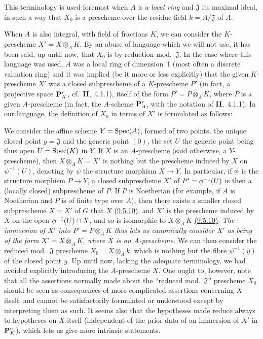 \begin{env}
\label{env-1.3.7.2}
This terminology is used foremost when $A$ is a \emph{local ring} and $\mathfrak{J}$ its maximal ideal, in such a way that $X_0$ is a prescheme over the residue field $k=A/\mathfrak{J}$ of $A$.

When $A$ is also integral, with field of fractions $K$, we can consider the $K$-prescheme $X'=X\otimes_A K$.
By an abuse of language which we will not use, it has been said, up until now, that $X_0$ is  by reduction mod.~$\mathfrak{J}$.
In the case where this language was used, $A$ was a local ring of dimension~1 (most often a discrete valuation ring) and it was implied (be it more or less explicitly) that the given $K$-prescheme $X'$ was a closed subprescheme of a $K$-prescheme $P'$ (in fact, a projective space  $\mathbf{P}_K^r$, cf.~\textbf{II},~4.1.1), itself of the form $P'=P\otimes_A K$, where $P$ is a given $A$-prescheme (in fact, the $A$-scheme $\mathbf{P}_A^r$, with the notation of \textbf{II},~4.1.1).
In our language, the definition of $X_0$ in terms of $X'$ is formulated as follows:

We consider the affine scheme $Y={\mathop{\mathrm{Spec}}\nolimits}(A)$, formed of two points, the unique closed point $y=\mathfrak{J}$ and the generic point $(0)$, the set $U$  the generic point being thus open $U={\mathop{\mathrm{Spec}}\nolimits}(K)$ in $Y$.
If $X$ is an $A$-prescheme (said otherwise, a $Y$-prescheme), then $X\otimes_A K=X'$ is nothing but the prescheme induced by $X$ on $\psi^{-1}(U)$, denoting by $\psi$ the structure morphism $X\to Y$.
In particular, if $\phi$ is the structure morphism $P\to Y$, a closed subprescheme $X'$ of $P'=\phi^{-1}(U)$ is then a (locally closed) subprescheme of $P$.
If $P$ is Noetherian (for example, if $A$ is Noetherian and $P$ is of finite type over $A$), then there exists a smaller closed subprescheme $X=\overline{X'}$ of $G$ that  $X$ \hyperref[prop-1.9.5.10]{(9.5.10)}, and $X'$ is the prescheme induced by $X$ on the open $\phi^{-1}(U)\cap X$, and so is isomorphic to $X\otimes_A K$ \hyperref[prop-1.9.5.10]{(9.5.10)}.
\emph{The immersion of $X'$ into $P'=P\otimes_A K$ thus lets us canonically consider $X'$ as being of the form $X'=X\otimes_A K$, where $X$ is an $A$-prescheme.}
We can then consider the reduced mod.~$\mathfrak{J}$ prescheme $X_0=X\otimes_A k$, which is nothing but the fibre $\psi^{-1}(y)$ of the closed point $y$.
Up until now, lacking the adequate terminology, we had avoided explicitly introducing the $A$-prescheme $X$.
One ought to, however, note that all the assertions normally made about the ``reduced mod.~$\mathfrak{J}$'' prescheme  $X_0$ should be seen as consequences of more complicated assertions concerning $X$ itself, and cannot be satisfactorily formulated or understood except by interpreting them as such.
It seems also that the hypotheses made reduce always to hypotheses on $X$ itself (independent of the prior data of an immersion of $X'$ in $\mathbf{P}_K^r$), which lets us give more intrinsic statements.
\end{env}

